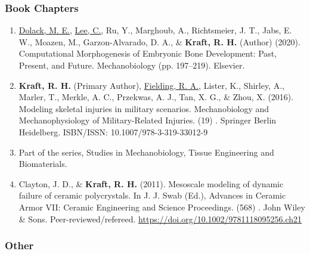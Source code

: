 \documentclass[a4paper,10pt]{article}
\begin{document}
\subsubsection{Book Chapters}\label{book-chapters}

\begin{enumerate}
\def\labelenumi{\arabic{enumi}.}
  \item \underline{Dolack, M. E.}, \underline{Lee, C.}, Ru, Y., Marghoub, A., Richtsmeier, J. T., Jabs, E. W., Moazen, M., Garzon-Alvarado, D. A., \&
 \textbf{\textbf{Kraft,} R. H.} (Author) (2020). Computational Morphogenesis of Embryonic Bone Development: Past, Present, and Future. Mechanobiology (pp. 197--219). Elsevier.
  \item \textbf{\textbf{Kraft,} R. H.} (Primary Author), \underline{Fielding, R. A.}, Lister, K., Shirley, A., Marler, T., Merkle, A. C., Przekwas, A. J., Tan, X. G., \&
 Zhou, X. (2016). Modeling skeletal injuries in military scenarios. Mechanobiology and Mechanophysiology of Military-Related Injuries. (19) . Springer Berlin Heidelberg. ISBN/ISSN: 10.1007/978-3-319-33012-9
  \item Part of the series, Studies in Mechanobiology, Tissue Engineering and Biomaterials.
  \item Clayton, J. D., \&
 \textbf{\textbf{Kraft,} R. H.} (2011). Mesoscale modeling of dynamic failure of ceramic polycrystals. In J. J. Swab (Ed.), Advances in Ceramic Armor VII: Ceramic Engineering and Science Proceedings. (568) . John Wiley \&
 Sons. Peer-reviewed/refereed. \url{https://doi.org/10.1002/9781118095256.ch21}

\end{enumerate}

\subsubsection{Other}\label{other}
\end{document}
